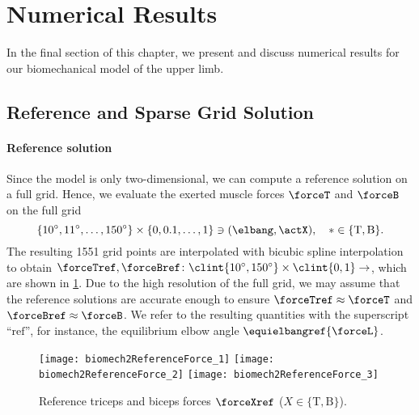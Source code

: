 \section{Numerical Results}
\label{sec:73results}


\noindent
In the final section of this chapter,
we present and discuss numerical results for our
biomechanical model of the upper limb.



\subsection{Reference and Sparse Grid Solution}
\label{sec:731solutionTypes}

\paragraph{Reference solution}

Since the model is only two-dimensional, we can compute a reference solution
on a full grid.
Hence, we evaluate the exerted muscle forces $\forceT$ and $\forceB$ on
the full grid
\begin{equation}
  \{\ang{10}, \ang{11}, \dotsc, \ang{150}\} \times \{0, 0.1, \dotsc, 1\}
  \ni (\elbang, \actX),\quad
  {\ast} \in \{\mathrm{T}, \mathrm{B}\}.
\end{equation}
The resulting \num{1551} grid points
are interpolated with bicubic spline interpolation
to obtain 
$\forceTref, \forceBref\colon
\clint{\ang{10}, \ang{150}} \times \clint{0, 1} \to \real$,
which are shown in \cref{fig:biomech2ReferenceForce}.
Due to the high resolution of the full grid,
we may assume that the reference solutions are accurate enough
to ensure $\forceTref \approx \forceT$ and $\forceBref \approx \forceB$.
We refer to the resulting quantities with the superscript ``$\mathrm{ref}$'',
for instance, the equilibrium elbow angle $\equielbangref{\forceL}$.

\begin{figure}
  \texttt{[image: biomech2ReferenceForce\_1]}%
  \;\;%
  \texttt{[image: biomech2ReferenceForce\_2]}%
  \hfill%
  \rlap{\raisebox{53mm}{\;$\forceXref$ [\si{\kilo\newton}]}}%
  \texttt{[image: biomech2ReferenceForce\_3]}%
  \caption[Reference triceps and biceps forces]{%
    Reference triceps and biceps forces $\forceXref$
    ($X \in \{\mathrm{T}, \mathrm{B}\}$).%
  }%
  \label{fig:biomech2ReferenceForce}%
\end{figure}

